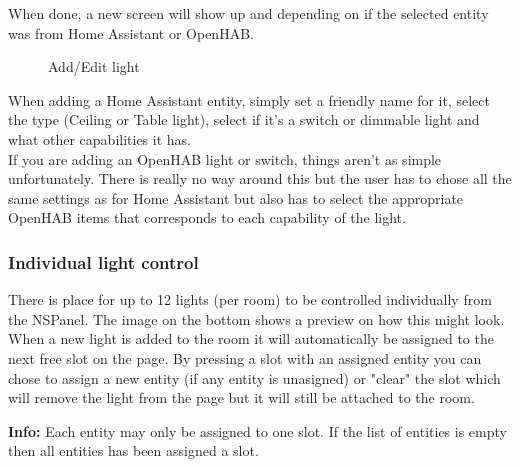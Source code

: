 \documentclass[10pt]{article}
\newcommand{\info}[1]{\begin{infoBox} \textbf{Info:} #1 \end{infoBox}}
\begin{document}
    When done, a new screen will show up and depending on if the selected entity was from Home Assistant or OpenHAB.

    \begin{figure}[H]
    \centering
    \qquad
    \caption{Add/Edit light}%
    \end{figure}
    
    When adding a Home Assistant entity, simply set a friendly name for it, select the type (Ceiling or Table light), select if it's a switch or dimmable light and what other capabilities it has.\\
    If you are adding an OpenHAB light or switch, things aren't as simple unfortunately. There is really no way around this but the user has to chose all the same settings as for Home Assistant but also has to select the appropriate OpenHAB items that corresponds to each capability of the light.

    \subsubsection{Individual light control}
    There is place for up to 12 lights (per room) to be controlled individually from the NSPanel. The image on the bottom shows a preview on how this might look. When a new light is added to the room it will automatically be assigned to the next free slot on the page. By pressing a slot with an assigned entity you can chose to assign a new entity (if any entity is unasigned) or "clear" the slot which will remove the light from the page but it will still be attached to the room.
    \info{Each entity may only be assigned to one slot. If the list of entities is empty then all entities has been assigned a slot.}
\end{document}
